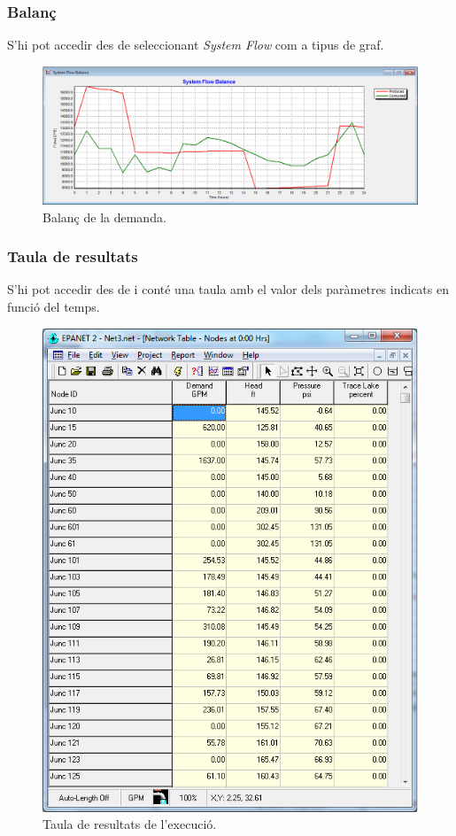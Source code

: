 \documentclass[12pt]{article}
\begin{document}
\subsubsection{Balanç}
S'hi pot accedir des de  seleccionant \textit{System Flow} com a tipus de graf.
\begin{figure}[h!]
	\centering
	\includegraphics[scale=.5]{imatges/epanet/reports/balans.png}
	\caption{Balanç de la demanda.}
\end{figure}

\subsubsection{Taula de resultats}
S'hi pot accedir des de  i conté una taula amb el valor dels paràmetres indicats en funció del temps.
\begin{figure}[h!]
	\centering
	\includegraphics[scale=.5]{imatges/epanet/reports/taula.png}
	\caption{Taula de resultats de l'execució.}
\end{figure}
\end{document}
